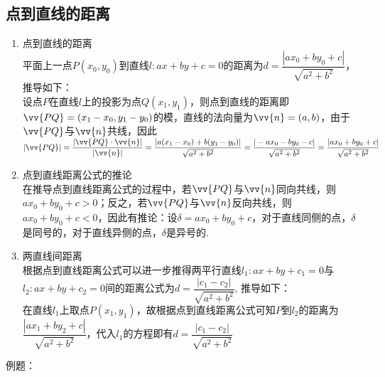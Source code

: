 \subsection*{点到直线的距离}
\begin{enumerate}
    \item 点到直线的距离\\
    平面上一点$P(x_0, y_0)$到直线$l: ax+by+c=0$的距离为$d = \dfrac{|ax_0+by_0+c|}{\sqrt{a^2+b^2}}$，推导如下：\\
    设点$P$在直线$l$上的投影为点$Q(x_1, y_1)$，则点到直线的距离即$\vv{PQ} = (x_1-x_0, y_1-y_0)$的模，直线的法向量为$\vv{n} = (a, b)$，由于$\vv{PQ}$与$\vv{n}$共线，因此$|\vv{PQ}| = \dfrac{|\vv{PQ} \cdot \vv{n}|}{|\vv{n}|} = \dfrac{|a(x_1-x_0)+b(y_1-y_0)|}{\sqrt{a^2+b^2}} = \dfrac{|-ax_0-by_0-c|}{\sqrt{a^2+b^2}} = \dfrac{|ax_0+by_0+c|}{\sqrt{a^2+b^2}}$
    \item 点到直线距离公式的推论 \\
    在推导点到直线距离公式的过程中，若$\vv{PQ}$与$\vv{n}$同向共线，则$ax_0+by_0+c > 0$；反之，若$\vv{PQ}$与$\vv{n}$反向共线，则$ax_0+by_0+c < 0$，因此有推论：设$\delta = ax_0+by_0+c$，对于直线同侧的点，$\delta$是同号的，对于直线异侧的点，$\delta$是异号的.
    \item 两直线间距离\\
    根据点到直线距离公式可以进一步推得两平行直线$l_1: ax+by+c_1=0$与$l_2: ax+by+c_2=0$间的距离公式为$d = \dfrac{|c_1-c_2|}{\sqrt{a^2+b^2}}$, 推导如下：\\
    在直线$l_1$上取点$P(x_1, y_1)$，故根据点到直线距离公式可知$P$到$l_2$的距离为$\dfrac{|ax_1+by_2+c|}{\sqrt{a^2+b^2}}$，代入$l_1$的方程即有$d = \dfrac{|c_1-c_2|}{\sqrt{a^2+b^2}}$
\end{enumerate}
例题：
